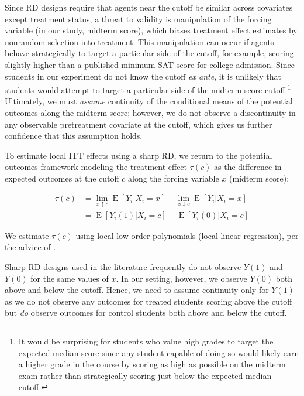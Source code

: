 \documentclass[12pt]{article}
\begin{document}
Since RD designs require that agents near the cutoff be similar across covariates except treatment status, a threat to validity is manipulation of the forcing variable (in our study, midterm score), which biases treatment effect estimates by nonrandom selection into treatment. This manipulation can occur if agents behave strategically to target a particular side of the cutoff, for example, scoring slightly higher than a published minimum SAT score for college admission. Since students in our experiment do not know the cutoff \textit{ex ante}, it is unlikely that students would attempt to target a particular side of the midterm score cutoff.\footnote{It would be surprising for students who value high grades to target the expected median score since any student capable of doing so would likely earn a higher grade in the course by scoring as high as possible on the midterm exam rather than strategically scoring just below the expected median cutoff.} Ultimately, we must \textit{assume} continuity of the conditional means of the potential outcomes along the midterm score; however, we do not observe a discontinuity in any observable pretreatment covariate at the cutoff, which gives us further confidence that this assumption holds.

To estimate local ITT effects using a sharp RD, we return to the potential outcomes framework modeling the treatment effect $\tau(c)$ as the difference in expected outcomes at the cutoff $c$ along the forcing variable $x$ (midterm score):

\begin{equation} \label{rd_spec}
\begin{split}
	\tau(c) & = \lim_{x \uparrow c} \operatorname{E}[Y_i | X_i = x] - \lim_{x \downarrow c} \operatorname{E}[Y_i | X_i = x] \\
	& = \operatorname{E}[Y_i(1) | X_i = c] - \operatorname{E}[Y_i(0) | X_i = c]
\end{split}
\end{equation}

We estimate $\tau(c)$ using local low-order polynomials (local linear regression), per the advice of \textcite{gi2019}.

Sharp RD designs used in the literature frequently do not observe $Y(1)$ and $Y(0)$ for the same values of $x$. In our setting, however, we observe $Y(0)$ both above and below the cutoff. Hence, we need to assume continuity only for $Y(1)$ as we do not observe any outcomes for treated students scoring above the cutoff but \textit{do} observe outcomes for control students both above and below the cutoff.
\end{document}
